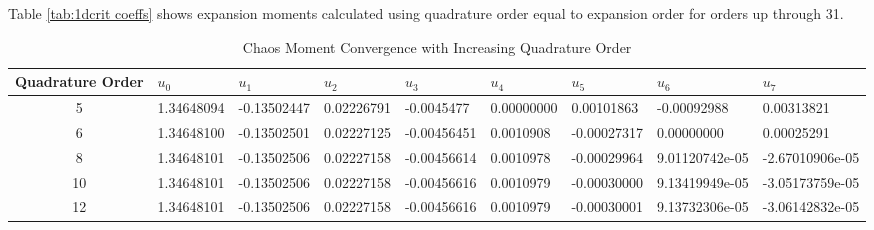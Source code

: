 Table \ref{tab:1dcrit coeffs} shows expansion moments calculated using quadrature order equal to expansion order for orders up through 31.


\begin{landscape}
\begin{table}[H]
\begin{center}
\begin{tabular}{c | *{8}{l}}
Quadrature Order & $u_0$ & $u_1$ & $u_2$ & $u_3$ & $u_4$ & $u_5$ & $u_6$ & $u_7$ \\ \hline
5 & 1.34648094 & -0.13502447 & 0.02226791 & -0.0045477 & 0.00000000 & 0.00101863 & -0.00092988 & 0.00313821\\
6 & 1.34648100 & -0.13502501 & 0.02227125 & -0.00456451 & 0.0010908 & -0.00027317 &  0.00000000 & 0.00025291\\ 
8 & 1.34648101 & -0.13502506 & 0.02227158 & -0.00456614 & 0.0010978 & -0.00029964 & 9.01120742e-05 & -2.67010906e-05\\ 
10& 1.34648101 & -0.13502506 & 0.02227158 & -0.00456616 & 0.0010979 & -0.00030000 & 9.13419949e-05 & -3.05173759e-05\\ 
12& 1.34648101 & -0.13502506 & 0.02227158 & -0.00456616 & 0.0010979 & -0.00030001 & 9.13732306e-05 & -3.06142832e-05
\end{tabular}
\end{center}
\caption{Chaos Moment Convergence with Increasing Quadrature Order}
\label{tab:quadconverge}
\end{table}
\end{landscape}


